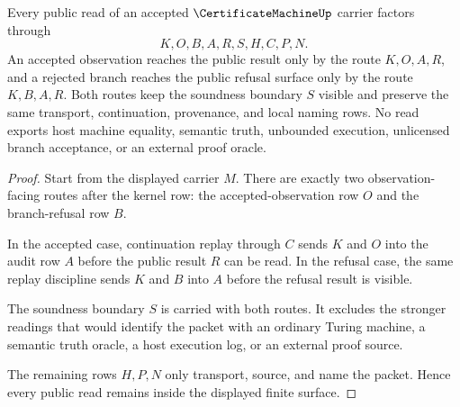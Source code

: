 \begin{theorem}
\label{thm:certificate-machine-audit-replay-nonescape}
Every public read of an accepted $\CertificateMachineUp$ carrier factors through
$$
K,O,B,A,R,S,H,C,P,N .
$$
An accepted observation reaches the public result only by the route $K,O,A,R$, and a rejected branch reaches the public refusal surface only by the route $K,B,A,R$. Both routes keep the soundness boundary $S$ visible and preserve the same transport, continuation, provenance, and local naming rows. No read exports host machine equality, semantic truth, unbounded execution, unlicensed branch acceptance, or an external proof oracle.
\end{theorem}
\begin{proof}
Start from the displayed carrier $M$. There are exactly two observation-facing routes after the kernel row: the accepted-observation row $O$ and the branch-refusal row $B$.

In the accepted case, continuation replay through $C$ sends $K$ and $O$ into the audit row $A$ before the public result $R$ can be read. In the refusal case, the same replay discipline sends $K$ and $B$ into $A$ before the refusal result is visible.

The soundness boundary $S$ is carried with both routes. It excludes the stronger readings that would identify the packet with an ordinary Turing machine, a semantic truth oracle, a host execution log, or an external proof source.

The remaining rows $H,P,N$ only transport, source, and name the packet. Hence every public read remains inside the displayed finite surface.
\end{proof}

